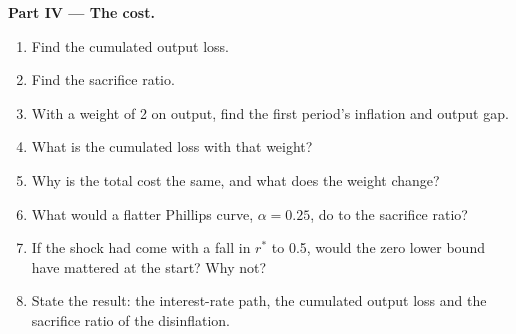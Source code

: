 \begin{problem}
\medskip
\noindent\textbf{Part IV --- The cost.}
\begin{enumerate}[resume]
  \item Find the cumulated output loss.
  \item Find the sacrifice ratio.
  \item With a weight of 2 on output, find the first period's inflation and output gap.
  \item What is the cumulated loss with that weight?
  \item Why is the total cost the same, and what does the weight change?
  \item What would a flatter Phillips curve, $\alpha = 0.25$, do to the sacrifice ratio?
  \item If the shock had come with a fall in $r^*$ to 0.5, would the zero lower bound have mattered at the start? Why not?
  \item State the result: the interest-rate path, the cumulated output loss and the sacrifice ratio of the disinflation.
\end{enumerate}
\end{problem}
